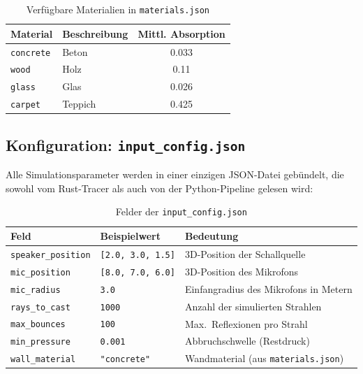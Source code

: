 \begin{table}[H]
    \centering
    \begin{tabular}{|l|l|c|}
        \hline
        \textbf{Material} & \textbf{Beschreibung} & \textbf{Mittl. Absorption} \\
        \hline
        \texttt{concrete} & Beton  & 0.033 \\
        \hline
        \texttt{wood}  & Holz & 0.11 \\
        \hline
        \texttt{glass}    & Glas  & 0.026 \\
        \hline
        \texttt{carpet}   & Teppich  & 0.425 \\
        \hline
    \end{tabular}
    \caption{Verf\"ugbare Materialien in \texttt{materials.json}}
\end{table}

\subsection{Konfiguration: \texttt{input\_config.json}}

Alle Simulationsparameter werden in einer einzigen JSON-Datei geb\"undelt,
die sowohl vom Rust-Tracer als auch von der Python-Pipeline gelesen wird:

\begin{table}[H]
    \centering
    \begin{tabular}{|l|l|p{5.5cm}|}
        \hline
        \textbf{Feld} & \textbf{Beispielwert} & \textbf{Bedeutung} \\
        \hline
        \texttt{speaker\_position} & \texttt{[2.0, 3.0, 1.5]} & 3D-Position der Schallquelle \\
        \hline
        \texttt{mic\_position} & \texttt{[8.0, 7.0, 6.0]} & 3D-Position des Mikrofons \\
        \hline
        \texttt{mic\_radius} & \texttt{3.0} & Einfangradius des Mikrofons in Metern \\
        \hline
        \texttt{rays\_to\_cast} & \texttt{1000} & Anzahl der simulierten Strahlen \\
        \hline
        \texttt{max\_bounces} & \texttt{100} & Max.\ Reflexionen pro Strahl \\
        \hline
        \texttt{min\_pressure} & \texttt{0.001} & Abbruchschwelle (Restdruck) \\
        \hline
        \texttt{wall\_material} & \texttt{"concrete"} & Wandmaterial (aus \texttt{materials.json}) \\
        \hline
    \end{tabular}
    \caption{Felder der \texttt{input\_config.json}}
\end{table}

